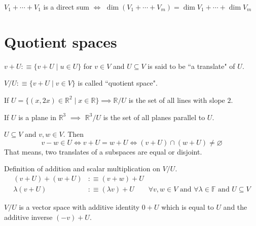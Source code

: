\begin{thm}$V_1 + \cdots + V_1$ is a direct sum $\iff$
$\dim (V_1+\cdots+V_m) = \dim V_1 + \cdots + \dim V_m$
\end{thm}

\section{Quotient spaces}

\setcounter{thm}{94}
\begin{mydef}
    $v+U :\equiv \{v+U \mid u\in U\}$ for $v\in V$ and $U\subseteq V$ is said to be ``a translate" of $U$.
\end{mydef}

\setcounter{thm}{98}
\begin{mydef}
    $V/U :\equiv \{v+U \mid v\in V\}$ is called ``quotient space".
\end{mydef} 

\begin{example}
    If $U=\{ (x,2x)\in \mathbb{R}^2 \mid x\in \mathbb{R} \} \implies \mathbb{R}/U$ is the set of all lines with slope $2$.
\end{example}

\begin{example}
    If $U$ is a plane in $\mathbb{R}^3$ $\implies$ $\mathbb{R}^3/U$ is the set of all planes parallel to $U$.
\end{example}


\setcounter{thm}{100}
\begin{thm}
    $ U \subseteq V$ and $v,w\in V$. Then
$$v-w \in U \iff v+U = w + U \iff (v+U) \cap (w+U) \neq \varnothing$$
That means, two translates of a subspaces are equal or disjoint.
\end{thm}

\begin{mydef}
    Definition of addition and scalar multiplication on $V/U$.
\begin{equation}
	\begin{aligned}
		(v+U)+(w+U) & :\equiv (v+w) + U \\
		\lambda (v+U) & :\equiv (\lambda v) + U \qquad \forall v,w \in V \text{ and } \forall \lambda \in \mathbb{F} 
		\text{ and } U \subseteq V
	\end{aligned}
\end{equation}
\end{mydef}

 
\begin{thm}
    $V/U$ is a vector space with additive identity $0+U$ which is equal to $U$ and the additive inverse $(-v)+U$.
\end{thm}

